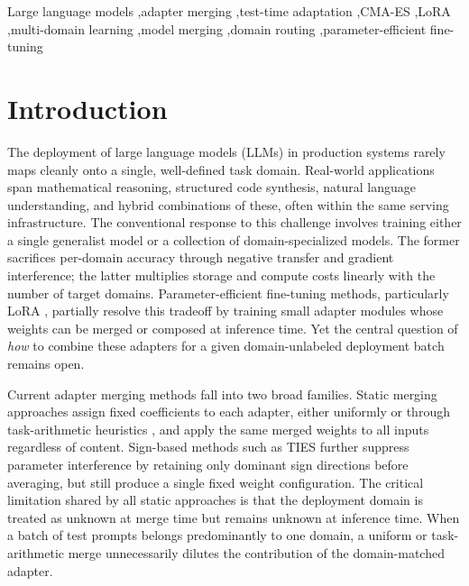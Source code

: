 \documentclass[preprint,12pt]{elsarticle}
\begin{document}
\begin{frontmatter}
\begin{keyword}
Large language models \sep adapter merging \sep test-time adaptation \sep CMA-ES \sep LoRA \sep multi-domain learning \sep model merging \sep domain routing \sep parameter-efficient fine-tuning
\end{keyword}

\end{frontmatter}


\section{Introduction}
\label{sec:intro}

The deployment of large language models (LLMs) in production
systems rarely maps cleanly onto a single, well-defined task domain.
Real-world applications span mathematical reasoning, structured code synthesis,
natural language understanding, and hybrid combinations of these, often
within the same serving infrastructure. The conventional response to this
challenge involves training either a single generalist model or a collection
of domain-specialized models. The former sacrifices per-domain accuracy
through negative transfer and gradient interference; the latter multiplies
storage and compute costs linearly with the number of target domains.
Parameter-efficient fine-tuning methods, particularly LoRA
\cite{hu2022lora}, partially resolve this tradeoff by training small
adapter modules whose weights can be merged or composed at inference time.
Yet the central question of \emph{how} to combine these adapters for a
given domain-unlabeled deployment batch remains open.

Current adapter merging methods fall into two broad families. Static
merging approaches assign fixed coefficients to each adapter, either
uniformly \cite{wortsman2022model} or through task-arithmetic heuristics
\cite{ilharco2023editing}, and apply the same merged weights to all inputs
regardless of content. Sign-based methods such as TIES
\cite{yadav2023tiesmerging} further suppress parameter interference by
retaining only dominant sign directions before averaging, but still produce
a single fixed weight configuration. The critical limitation shared by all
static approaches is that the deployment domain is treated as unknown at
merge time but remains unknown at inference time. When a batch of test
prompts belongs predominantly to one domain, a uniform or task-arithmetic
merge unnecessarily dilutes the contribution of the domain-matched adapter.
\end{document}
